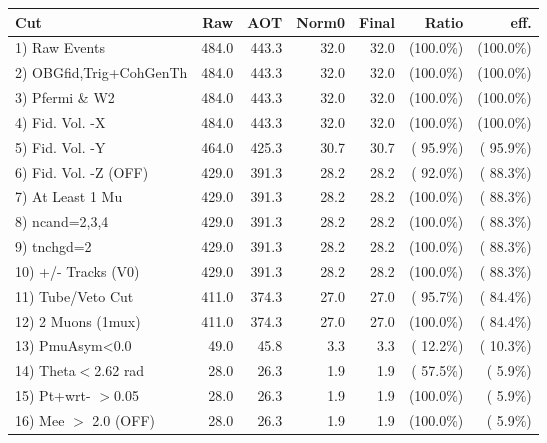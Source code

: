  \begin{table}[h!]\centering
 \begin{tabular}{||l||r|r|r|r|r|r||}
 \hline
 \hline
 Cut & Raw & AOT & Norm0 & Final & Ratio & eff.       \\
 \hline
  1) Raw Events           &        484.0 &        443.3 &         32.0 &         32.0 & (100.0\%) & (100.0\%) \\
  2) OBGfid,Trig+CohGenTh &        484.0 &        443.3 &         32.0 &         32.0 & (100.0\%) & (100.0\%) \\
  3) Pfermi \& W2         &        484.0 &        443.3 &         32.0 &         32.0 & (100.0\%) & (100.0\%) \\
  4) Fid. Vol. -X         &        484.0 &        443.3 &         32.0 &         32.0 & (100.0\%) & (100.0\%) \\
  5) Fid. Vol. -Y         &        464.0 &        425.3 &         30.7 &         30.7 & ( 95.9\%) & ( 95.9\%) \\
  6) Fid. Vol. -Z (OFF)   &        429.0 &        391.3 &         28.2 &         28.2 & ( 92.0\%) & ( 88.3\%) \\
  7) At Least 1 Mu        &        429.0 &        391.3 &         28.2 &         28.2 & (100.0\%) & ( 88.3\%) \\
  8) ncand=2,3,4          &        429.0 &        391.3 &         28.2 &         28.2 & (100.0\%) & ( 88.3\%) \\
  9) tnchgd=2             &        429.0 &        391.3 &         28.2 &         28.2 & (100.0\%) & ( 88.3\%) \\
 10) +/- Tracks (V0)      &        429.0 &        391.3 &         28.2 &         28.2 & (100.0\%) & ( 88.3\%) \\
 11) Tube/Veto Cut        &        411.0 &        374.3 &         27.0 &         27.0 & ( 95.7\%) & ( 84.4\%) \\
 12) 2 Muons (1mux)       &        411.0 &        374.3 &         27.0 &         27.0 & (100.0\%) & ( 84.4\%) \\
 13) PmuAsym<0.0          &         49.0 &         45.8 &          3.3 &          3.3 & ( 12.2\%) & ( 10.3\%) \\
 14) Theta$<$2.62 rad     &         28.0 &         26.3 &          1.9 &          1.9 & ( 57.5\%) & (  5.9\%) \\
 15) Pt+wrt- $>$0.05      &         28.0 &         26.3 &          1.9 &          1.9 & (100.0\%) & (  5.9\%) \\
 16) Mee $>$ 2.0  (OFF)   &         28.0 &         26.3 &          1.9 &          1.9 & (100.0\%) & (  5.9\%) \\

\end{tabular}
\end{table}
